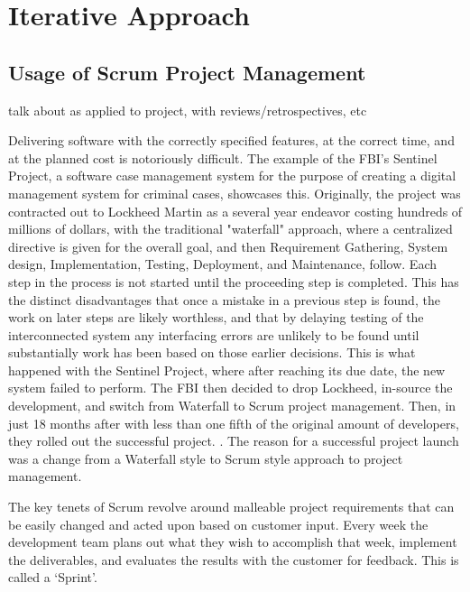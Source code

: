 \documentclass[openright]{report}
\begin{document}
\chapter{Iterative Approach}

\section{Usage of Scrum Project Management}
talk about as applied to project, with reviews/retrospectives, etc

Delivering software with the correctly specified features, at the correct time, and at the planned cost is notoriously difficult. The example of the FBI’s Sentinel Project, a software case management system for the purpose of creating a digital management system for criminal cases, showcases this. Originally, the project was contracted out to Lockheed Martin as a several year endeavor costing hundreds of millions of dollars, with the traditional "waterfall" approach, where a centralized directive is given for the overall goal, and then Requirement Gathering, System design, Implementation, Testing, Deployment, and Maintenance, follow. Each step in the process is not started until the proceeding step is completed. This has the distinct disadvantages that once a mistake in a previous step is found, the work on later steps are likely worthless, and that by delaying testing of the interconnected system any interfacing errors are unlikely to be found until substantially work has been based on those earlier decisions{\cite{scrumFBI}}.  This is what happened with the Sentinel Project, where after reaching its due date, the new system failed to perform. The FBI then decided to drop Lockheed, in-source the development, and switch from Waterfall to Scrum project management. Then, in just 18 months after with less than one fifth of the original amount of developers, they rolled out the successful project. {\cite{scrumFBI}}. The reason for a successful project launch was a change from a Waterfall style to Scrum style approach to project management.


The key tenets of Scrum revolve around malleable project requirements that can be easily changed and acted upon based on customer input. Every week the development team plans out what they wish to accomplish that week, implement the deliverables, and evaluates the results with the customer for feedback. This is called a ‘Sprint’.
\end{document}
